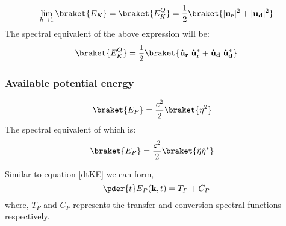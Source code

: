 \begin{equation}
    \lim_{h \to 1} \braket{E_K} = \braket{E_K^{Q}}
    =  \frac{1}{2}\braket{|\mathbf{u_r}  | ^2 + | \mathbf{u_d} | ^2}
\end{equation}
The spectral equivalent of the above expression will be:
\begin{equation}
    \braket{E_K^{Q} }
    =  \frac{1}{2}\braket{ \mathbf{\hat{u}_r}.\mathbf{\hat{u}_r}^* +
        \mathbf{\hat{u}_d}.\mathbf{\hat{u}_d}^* }
\end{equation}

\subsubsection{Available potential energy}
\begin{align}
    \braket{ E_P}
     & = \frac{c^2}{2} \braket{ \eta^2}
\end{align}
The spectral equivalent of which is:
\begin{align}
    \braket{ E_P}
     & = \frac{c^2}{2} \braket{ \hat{\eta}\hat{\eta}^*}
\end{align}

Similar to equation \eqref{dtKE} we can form,
\begin{equation}\label{dtPE}
    \pder{t}E_P(\mathbf{k},t) = T_P+ C_P
\end{equation}
where, $T_P$ and $C_P$ represents the transfer and conversion spectral
functions respectively.

